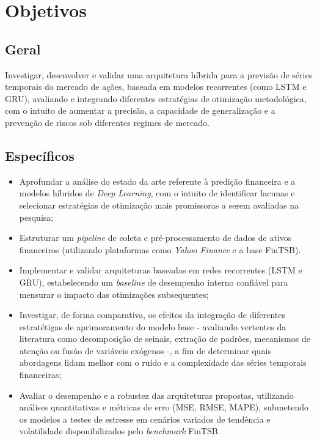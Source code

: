 \documentclass[12pt, a4paper, twoside]{article}
\begin{document}
\newpage

\section{Objetivos}

\subsection{Geral}

Investigar, desenvolver e validar uma arquitetura híbrida para a previsão de séries temporais do mercado de ações, baseada em modelos recorrentes (como LSTM e GRU), avaliando e integrando diferentes estratégias de otimização metodológica, com o intuito de aumentar a precisão, a capacidade de generalização e a prevenção de riscos sob diferentes regimes de mercado.

\subsection{Específicos}

\begin{itemize}
    \item Aprofundar a análise do estado da arte referente à predição financeira e a modelos híbridos de \textit{Deep Learning}, com o intuito de identificar lacunas e selecionar estratégias de otimização mais promissoras a serem avaliadas na pesquisa;

    \item Estruturar um \textit{pipeline} de coleta e pré-processamento de dados de ativos financeiros (utilizando plataformas como \textit{Yahoo Finance} e a base FinTSB).

    \item Implementar e validar arquiteturas baseadas em redes recorrentes (LSTM e GRU), estabelecendo um \textit{baseline} de desempenho interno confiável para mensurar o impacto das otimizações subsequentes;

    \item Investigar, de forma comparativa, os efeitos da integração de diferentes estratétigas de aprimoramento do modelo base - avaliando vertentes da literatura como decomposição de seinais, extração de padrões, mecanismos de atenção ou fusão de variáveis exógenos -, a fim de determinar quais abordagens lidam melhor com o ruído e a complexidade das séries temporais financeiras;

    \item Avaliar o desempenho e a robustez das arquiteturas propostas, utilizando análises quantitativas e métricas de erro (MSE, RMSE, MAPE), submetendo os modelos a testes de estresse em cenários variados de tendência e volatilidade disponibilizados pelo \textit{benchmark} FinTSB.
\end{itemize}
\end{document}
